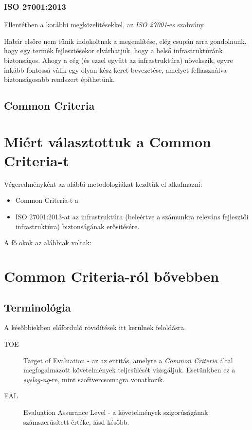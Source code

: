 \subsubsection{ISO 27001:2013}
Ellentétben a korábbi megközelítésekkel, az \emph{ISO 27001}-es szabvány 

Habár elsőre nem tűnik indokoltnak a megemlítése, elég csupán arra gondolnunk, hogy egy termék
fejlesztésekor elvárhatjuk, hogy a belső infrastruktúránk biztonságos.  Ahogy a cég (és ezzel együtt
az infrastruktúra) növekszik, egyre inkább fontossá válik egy olyan kész keret bevezetése, amelyet
felhasználva biztonságosabb rendszert építhetünk.

\subsection{Common Criteria}

\section{Miért választottuk a Common Criteria-t}

Végeredményként az alábbi metodologiákat kezdtük el alkalmazni:
\begin{itemize}
\item Common Criteria-t a 
\item{ISO 27001:2013-at az infrastruktúra (beleértve a számunkra releváns fejlesztői infrastruktúra)
    biztonságának erősítésére.}
\end{itemize}

A fő okok az alábbiak voltak:


\section{Common Criteria-ról bővebben}

\subsection{Terminológia}

A későbbiekben előforduló rövidítések itt kerülnek feloldásra.

\begin{description}
    \item[TOE]{Target of Evaluation - az az entitás, amelyre a \emph{Common Criteria} által
            megfogalmazott követelmények teljesülését vizsgáljuk. Esetünkben ez a \emph{syslog-ng}-re,
        mint szoftvercsomagra vonatkozik.}
    \item[EAL]{Evaluation Assurance Level - a követelmények szigorúságának számszerűsített értéke,
        lásd később.}
\end{description}

